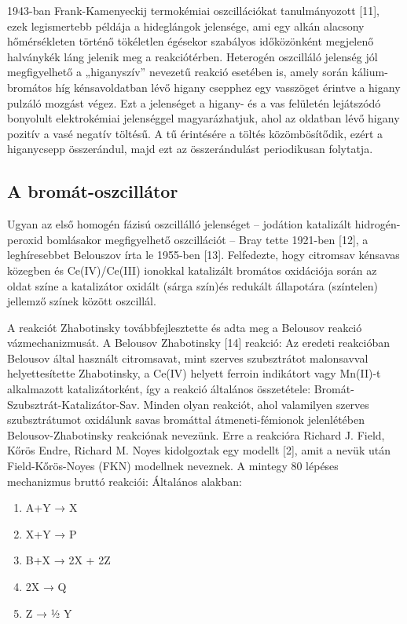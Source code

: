1943-ban Frank-Kamenyeckij termokémiai oszcillációkat tanulmányozott [11], ezek legismertebb példája a hideglángok jelensége, ami egy alkán alacsony hőmérsékleten történő tökéletlen égésekor szabályos időközönként megjelenő halványkék láng jelenik meg a reakciótérben.
Heterogén oszcilláló jelenség jól megfigyelhető a „higanyszív” nevezetű reakció esetében is, amely során kálium-bromátos híg kénsavoldatban lévő higany csepphez egy vasszöget érintve a higany pulzáló mozgást végez. Ezt a jelenséget a higany- és a vas felületén lejátszódó bonyolult elektrokémiai jelenséggel magyarázhatjuk, ahol az oldatban lévő higany pozitív a vasé negatív töltésű. A tű érintésére a töltés közömbösítődik, ezért a higanycsepp összerándul, majd ezt az összerándulást periodikusan folytatja.

\subsection{A bromát-oszcillátor}
Ugyan az első homogén fázisú oszcillálló jelenséget -- jodátion katalizált hidrogén-peroxid bomlásakor megfigyelhető oszcillációt -- Bray tette 1921-ben [12], a leghíresebbet Belouszov írta le 1955-ben [13]. Felfedezte, hogy citromsav kénsavas közegben és Ce(IV)/Ce(III) ionokkal katalizált bromátos oxidációja során az oldat színe a katalizátor oxidált (sárga szín)és redukált állapotára (színtelen) jellemző színek között oszcillál.

A reakciót Zhabotinsky továbbfejlesztette és adta meg a Belousov reakció vázmechanizmusát. A Belousov Zhabotinsky [14] reakció:
Az eredeti reakcióban Belousov által használt citromsavat, mint szerves szubsztrátot malonsavval helyettesítette Zhabotinsky, a Ce(IV) helyett ferroin indikátort vagy Mn(II)-t alkalmazott katalizátorként, így a reakció általános összetétele: Bromát-Szubsztrát-Katalizátor-Sav.
Minden olyan reakciót, ahol valamilyen szerves szubsztrátumot oxidálunk savas bromáttal átmeneti-fémionok jelenlétében Belousov-Zhabotinsky reakciónak nevezünk. Erre a reakcióra Richard J. Field, Kőrös Endre, Richard M. Noyes kidolgoztak egy modellt [2], amit a nevük után Field-Kőrös-Noyes (FKN) modellnek neveznek. A mintegy 80 lépéses mechanizmus bruttó reakciói:
Általános alakban:

\begin{enumerate}
\item A+Y → X
\item X+Y → P
\item B+X → 2X + 2Z
\item 2X → Q
\item Z → ½ Y
\end{enumerate}

